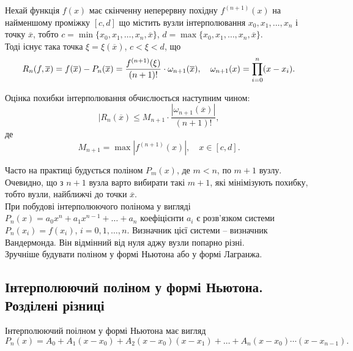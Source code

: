 \begin{theorem}
	\label{th:2.1}
	Нехай функція $f(x)$ має скінченну неперервну похідну $f^{(n+1)}(x)$ на найменшому проміжку $[c, d]$ що містить вузли інтерполювання $x_0, x_1, \ldots, x_n$ і точку $\overline{x}$, тобто $c = \min\{x_0, x_1, \ldots, x_n, \overline{x}\}$, $d = \max\{x_0, x_1, \ldots, x_n, \overline{x}\}$. \\

	Тоді  існує така точка $\xi = \xi(\overline{x})$, $c < \xi < d$, що
	\begin{equation}
		\label{eq:2.1}
		R_n(f,\overline{x}) = f(\overline{x}) - P_n(\overline{x}) = \frac{f^{(n+1)}(\xi)}{(n+1)!} \cdot \omega_{n+1}(\overline{x}), \quad \omega_{n+1}(x) = \displaystyle\prod\limits_{i=0}^n (x - x_i).
	\end{equation}

	Оцінка похибки інтерполювання обчислюється наступним чином:
	\begin{equation}
		\label{eq:2.2}
		|R_n(\overline{x}) \le M_{n+1} \cdot \frac{|\omega_{n+1}(\overline{x})|}{(n+1)!},
	\end{equation}
	де
	\begin{equation*}
		M_{n+1} = \max |f^{(n+1)}(x)|, \quad x\in[c,d].
	\end{equation*}
\end{theorem}

Часто на практиці будується поліном $P_m(x)$, де $m < n$, по $m + 1$ вузлу. Очевидно, що з $n + 1$ вузла варто вибирати такі $m + 1$, які мінімізують похибку, тобто вузли, найближчі до точки $\overline{x}$. \\

При побудові інтерполюючого полінома у вигляді $P_n(x) = a_0 x^n + a_1 x^{n-1} + \ldots + a_n$ коефіцієнти $a_i$ є розв'язком системи $P_n(x_i) = f(x_i)$, $i = 0, 1, \ldots, n$. Визначник цієї системи -- визначник Вандермонда. Він відмінний від нуля аджу вузли попарно різні. \\

Зручніше будувати поліном у формі Ньютона або у формі Лагранжа.

\subsection{Інтерполюючий поліном у формі Ньютона. Розділені різниці}

Інтерполюючий поілном у формі Ньютона має вигляд
\begin{equation}
	\label{eq:2.3}
	P_n(x) = A_0 + A_1 (x - x_0) + A_2 (x - x_0) (x - x_1) + \ldots + A_n (x - x_0) \cdots (x - x_{n-1}).
\end{equation}

